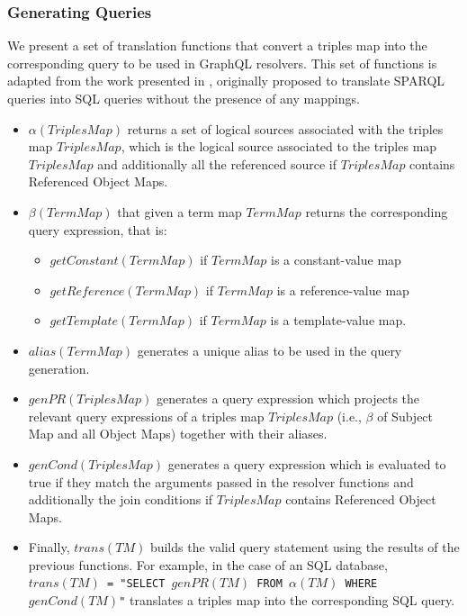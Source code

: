\subsubsection{Generating Queries} 
We present a set of translation functions that convert a triples map into the corresponding query to be used in GraphQL resolvers. This set of functions is adapted from the work presented in \citep{chebotko2009semantics}, originally proposed to translate SPARQL queries into SQL queries without the presence of any mappings. 
\begin{itemize}
    \item $\alpha(TriplesMap)$ returns a set of logical sources associated with the triples map $TriplesMap$, which is the logical source associated to the triples map $TriplesMap$ and additionally all the referenced source if $TriplesMap$ contains Referenced Object Maps.
    \item $\beta(TermMap)$ that given a term map $TermMap$ returns the corresponding query expression, that is: 
    \begin{itemize}
        \item $getConstant(TermMap)$ if $TermMap$ is a constant-value map
        \item $getReference(TermMap)$ if $TermMap$ is a reference-value map
        \item $getTemplate(TermMap)$ if $TermMap$ is a template-value map.
    \end{itemize}    
    \item $alias(TermMap)$ generates a unique alias to be used in the query generation.    
    \item $genPR(TriplesMap)$ generates a query expression which projects the relevant query expressions of a triples map $TriplesMap$ (i.e., $\beta$ of Subject Map and all Object Maps) together with their aliases.
    \item $genCond(TriplesMap)$ generates a query expression which is evaluated to true if they match the arguments passed in the resolver functions and additionally the join conditions if $TriplesMap$ contains Referenced Object Maps.
    \item Finally, $trans(TM)$ builds the valid query statement using the results of the previous functions. For example, in the case of an SQL database, \texttt{$trans(TM)$ = "SELECT $genPR(TM)$ FROM $\alpha(TM)$ WHERE $genCond(TM)$"} translates a triples map into the corresponding SQL query.
\end{itemize}

